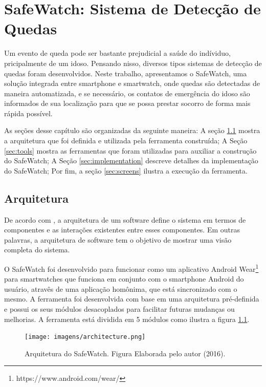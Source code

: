 \chapter{SafeWatch: Sistema de Detecção de Quedas}
\label{cap:safeWatch}

Um evento de queda pode ser bastante prejudicial a saúde do indíviduo, pricipalmente de um idoso. Pensando nisso, diversos tipos sistemas de detecção de quedas foram desenvolvidos. Neste trabalho, apresentamos o SafeWatch, uma solução integrada entre smartphone e smartwatch, onde quedas são detectadas de maneira automatizada, e se necessário, os contatos de emergência do idoso são informados de sua localização para que se possa prestar socorro de forma mais rápida possível. 


As seções desse capítulo são organizadas da seguinte maneira: A seção \ref{sec:architecture} mostra a arquitetura que foi definida e utilizada pela ferramenta construída; A Seção \ref{sec:tools} mostra as ferramentas que foram utilizadas para auxiliar a construção do SafeWatch; A Seção \ref{sec:implementation} descreve detalhes da implementação do SafeWatch; Por fim, a seção \ref{sec:screens} ilustra a execução da ferramenta.



\section{Arquitetura}
\label{sec:architecture}

De acordo com \cite{garlan1993introduction}, a arquitetura de um software define o sistema em termos de componentes e as interações existentes entre esses componentes. Em outras palavras, a arquitetura de software tem o objetivo de mostrar uma visão completa do sistema. 

O SafeWatch foi desenvolvido para funcionar como um aplicativo Android Wear\footnote{https://www.android.com/wear/} para smartwatches que funciona em conjunto com o smartphone Android do usuário, atravês de uma aplicação homônima, que está sincronizado com o mesmo. A ferramenta foi desenvolvida com base em uma arquitetura pré-definida e possui os seus módulos desacoplados para facilitar futuras mudanças ou melhorias. A ferramenta está dividida em 5 módulos como ilustra a figura \ref{fig:architecture}.

\begin{figure}[ht]
	\centering
	\texttt{[image: imagens/architecture.png]}
	\caption{ Arquitetura do SafeWatch. Figura Elaborada pelo autor (2016).}
	\label{fig:architecture}
\end{figure} 



